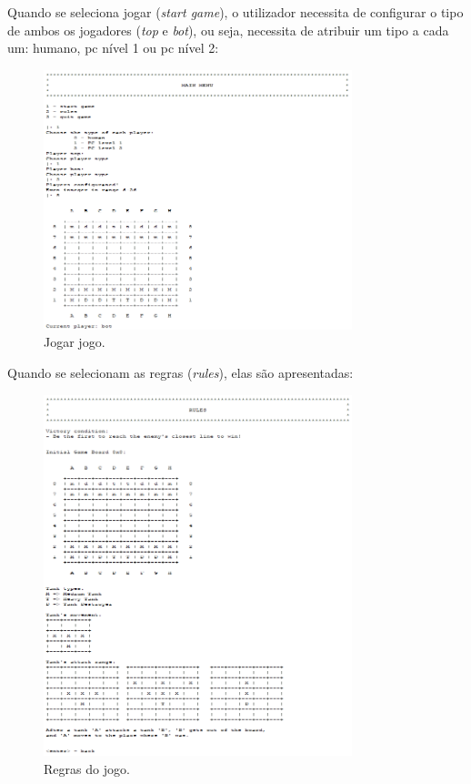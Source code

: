 \documentclass[a4paper,11pt,portuguese]{article}
\begin{document}
    \noindent Quando se seleciona jogar (\textit{start game}), o utilizador necessita de configurar
    o tipo de ambos os jogadores (\textit{top} e \textit{bot}), ou seja, necessita de atribuir um tipo a cada um:
    humano, pc nível 1 ou pc nível 2:

    \begin{figure}[H]
        \centering
        \includegraphics[width=0.8\textwidth]{imgs/start_game.png}
        \caption{Jogar jogo.}
        \label{fig:start_game}
    \end{figure}


    \noindent Quando se selecionam as regras (\textit{rules}), elas são apresentadas:

    \begin{figure}[H]
        \centering
        \includegraphics[width=0.8\textwidth]{imgs/rules.png}
        \caption{Regras do jogo.}
        \label{fig:game_rules}
    \end{figure}
\end{document}
